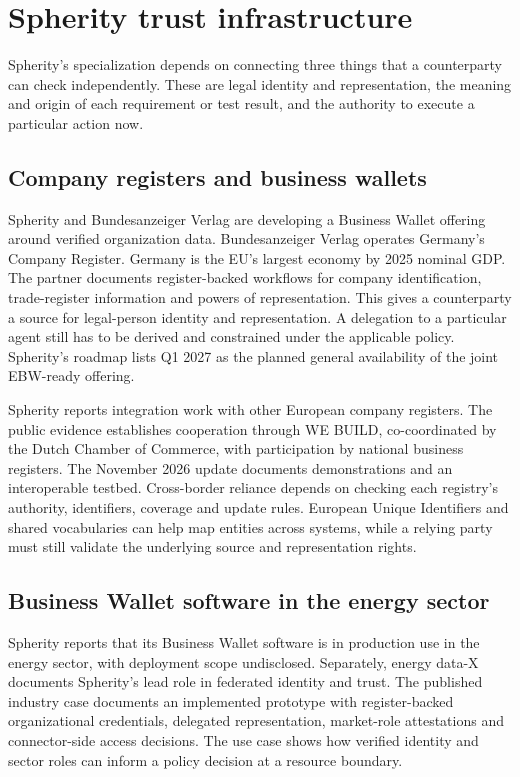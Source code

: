 \section{Spherity trust infrastructure}
\label{sec:spherity}

Spherity's specialization depends on connecting three things that a counterparty can check independently. These are legal identity and representation, the meaning and origin of each requirement or test result, and the authority to execute a particular action now.~\cite{src77}

\subsection{Company registers and business wallets}

Spherity and Bundesanzeiger Verlag are developing a Business Wallet offering around verified organization data. Bundesanzeiger Verlag operates Germany's Company Register. Germany is the EU's largest economy by 2025 nominal GDP. The partner documents register-backed workflows for company identification, trade-register information and powers of representation. This gives a counterparty a source for legal-person identity and representation. A delegation to a particular agent still has to be derived and constrained under the applicable policy. Spherity's roadmap lists Q1 2027 as the planned general availability of the joint EBW-ready offering.~\cite{src78,src79,src80,src81}

Spherity reports integration work with other European company registers. The public evidence establishes cooperation through WE BUILD, co-coordinated by the Dutch Chamber of Commerce, with participation by national business registers. The November 2026 update documents demonstrations and an interoperable testbed. Cross-border reliance depends on checking each registry's authority, identifiers, coverage and update rules. European Unique Identifiers and shared vocabularies can help map entities across systems, while a relying party must still validate the underlying source and representation rights.~\cite{src58,src82,src83,src84}

\subsection{Business Wallet software in the energy sector}

Spherity reports that its Business Wallet software is in production use in the energy sector, with deployment scope undisclosed. Separately, energy data-X documents Spherity's lead role in federated identity and trust. The published industry case documents an implemented prototype with register-backed organizational credentials, delegated representation, market-role attestations and connector-side access decisions. The use case shows how verified identity and sector roles can inform a policy decision at a resource boundary.~\cite{src82,src85,src86}

